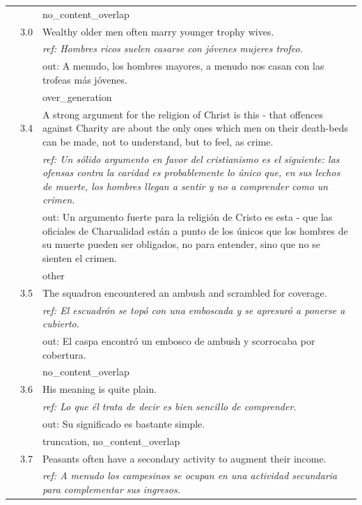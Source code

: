 \begin{longtable}{@{}rp{0.7cm}p{11cm}@{}}
& & \scriptsize no\_content\_overlap \\\addlinespace
8 & 3.0 & \small Wealthy older men often marry younger trophy wives. \\
& & \small\itshape ref: Hombres ricos suelen casarse con jóvenes mujeres trofeo. \\
& & \small\ttfamily out: A menudo, los hombres mayores, a menudo nos casan con las trofeas más jóvenes. \\
& & \scriptsize over\_generation \\\addlinespace
9 & 3.4 & \small A strong argument for the religion of Christ is this - that offences against Charity are about the only ones which men on their death-beds can be made, not to understand, but to feel, as crime. \\
& & \small\itshape ref: Un sólido argumento en favor del cristianismo es el siguiente: las ofensas contra la caridad es probablemente lo único que, en sus lechos de muerte, los hombres llegan a sentir y no a comprender como un crimen. \\
& & \small\ttfamily out: Un argumento fuerte para la religión de Cristo es esta - que las oficiales de Charualidad están a punto de los únicos que los hombres de su muerte pueden ser obligados, no para entender, sino que no se sienten el crimen. \\
& & \scriptsize other \\\addlinespace
10 & 3.5 & \small The squadron encountered an ambush and scrambled for coverage. \\
& & \small\itshape ref: El escuadrón se topó con una emboscada y se apresuró a ponerse a cubierto. \\
& & \small\ttfamily out: El caspa encontró un embosco de ambush y scorrocaba por cobertura. \\
& & \scriptsize no\_content\_overlap \\\addlinespace
11 & 3.6 & \small His meaning is quite plain. \\
& & \small\itshape ref: Lo que él trata de decir es bien sencillo de comprender. \\
& & \small\ttfamily out: Su significado es bastante simple. \\
& & \scriptsize truncation, no\_content\_overlap \\\addlinespace
12 & 3.7 & \small Peasants often have a secondary activity to augment their income. \\
& & \small\itshape ref: A menudo los campesinos se ocupan en una actividad secundaria para complementar sus ingresos. \\

\end{longtable}
